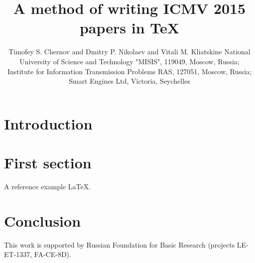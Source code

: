 \documentclass{spie}
\title{A method of writing ICMV 2015 papers in TeX}
\author{Timofey S. Chernov\supit{1} and Dmitry P. Nikolaev\supit{2} and Vitali M. Kliatskine\supit{3} 
  \skiplinehalf
  \normalsize 
  \supit{1}National University of Science and Technology "MISIS", 119049, Moscow, Russia; \\
  \supit{2}Institute for Information Transmission Problems RAS, 127051, Moscow, Russia; \\
  \supit{3}Smart Engines Ltd, Victoria, Seychelles
}
\begin{document}
\maketitle

\begin{abstract}
  \lipsum[6]
  
\end{abstract}

\section{Introduction}

\lipsum[1]

\section{First section}

A reference example \LaTeX \cite{fourier_applications}.

\section{Conclusion}

\lipsum[42]

\acknowledgements

This work is supported by Russian Foundation for Basic Research (projects LE-ET-1337, FA-CE-8D). 



\end{document}
